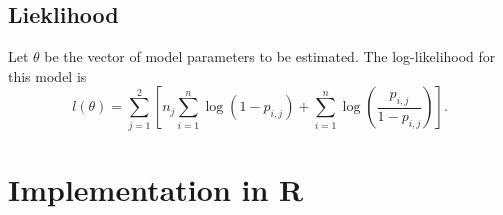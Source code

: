 \documentclass[11pt,]{article}
\begin{document}
\subsection{Lieklihood}\label{lieklihood}

Let \(\theta\) be the vector of model parameters to be estimated. The
log-likelihood for this model is
\[l\left(\theta\right)=\sum_{j=1}^{2}\left[n_{j}\sum_{i=1}^{n}\log\left(1-p_{i,j}\right)+\sum_{i=1}^{n}\log\left(\frac{p_{i,j}}{1-p_{i,j}}\right)\right].\]

\section{Implementation in R}\label{implementation-in-r}




\newpage
\singlespacing 

\end{document}
